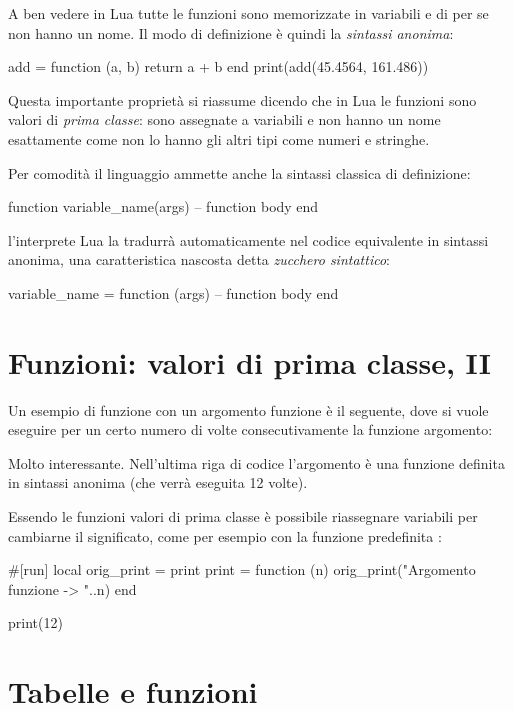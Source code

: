 A ben vedere in Lua tutte le funzioni sono memorizzate in variabili e di per se
non hanno un nome. Il modo di definizione è quindi la \emph{sintassi anonima}:
\begin{lines}
add = function (a, b)
    return a + b
end
print(add(45.4564, 161.486))
\end{lines}

Questa importante proprietà si riassume dicendo che in Lua le funzioni sono
valori di \emph{prima classe}: sono assegnate a variabili e non hanno un nome
esattamente come non lo hanno gli altri tipi come numeri e stringhe.

Per comodità il linguaggio ammette anche la sintassi classica di definizione:
\begin{lines}
function variable_name(args)
    -- function body
end
\end{lines}
l'interprete Lua la tradurrà automaticamente nel codice equivalente in sintassi
anonima, una caratteristica nascosta detta \emph{zucchero sintattico}:
\begin{lines}
variable_name = function (args)
    -- function body
end
\end{lines}


\section{Funzioni: valori di prima classe, II}

Un esempio di funzione con un argomento funzione è il seguente, dove si vuole
eseguire per un certo numero di volte consecutivamente la funzione argomento:

Molto interessante. Nell'ultima riga di codice l'argomento è una funzione
definita in sintassi anonima (che verrà eseguita 12 volte).

Essendo le funzioni valori di prima classe è possibile riassegnare variabili per
cambiarne il significato, come per esempio con la funzione predefinita
:
\begin{lines}
#[run]
local orig_print = print
print = function (n)
    orig_print("Argomento funzione -> "..n)
end

print(12)
\end{lines}


\section{Tabelle e funzioni}

